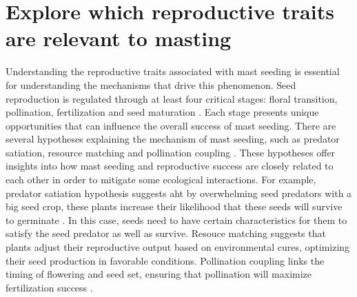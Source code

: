 \documentclass[11pt,letter]{article}
\begin{document}
\section{Explore which reproductive traits are relevant to masting}
Understanding the reproductive traits associated with mast seeding is essential for understanding the mechanisms that drive this phenomenon. Seed reproduction is regulated through at least four critical stages: floral transition, pollination, fertilization and seed maturation \citep{satake2021studying}. Each stage presents unique opportunities that can influence the overall success of mast seeding. There are several hypotheses explaining the mechanism of mast seeding, such as predator satiation, resource matching and pollination coupling \citep{kelly1994evolutionary, kelly2002mast, crone2014resource}. These hypotheses offer insights into how mast seeding and reproductive success are closely related to each other in order to mitigate some ecological interactions. For example, predator satiation hypothesis suggests aht by overwhelming seed predators with a big seed crop, these plants increase their likelihood that these seeds will survive to germinate \citep{janzen1971seed, silvertown1980evolutionary}. In this case, seeds need to have certain characteristics for them to satisfy the seed predator as well as survive. Resouce matching suggests that plants adjust their reproductive output based on environmental cures, optimizing their seed production in favorable conditions. Pollination coupling links the timing of flowering and seed set, ensuring that pollination will maximize fertilization success \citep{bogdziewicz2017masting, bogdziewicz2020flowering}. 
\end{document}
